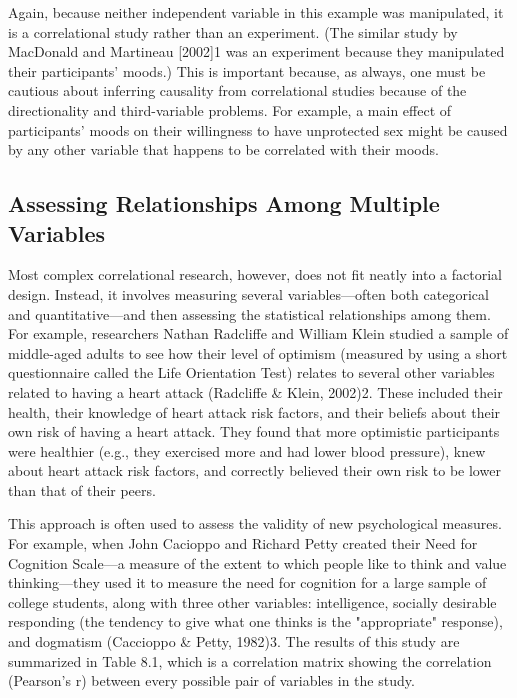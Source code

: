 Again, because neither independent variable in this example was manipulated, it is a correlational study rather than an experiment. (The similar study by MacDonald and Martineau [2002]1 was an experiment because they manipulated their participants' moods.) This is important because, as always, one must be cautious about inferring causality from correlational studies because of the directionality and third-variable problems. For example, a main effect of participants' moods on their willingness to have unprotected sex might be caused by any other variable that happens to be correlated with their moods.

\subsection{Assessing Relationships Among Multiple Variables}

Most complex correlational research, however, does not fit neatly into a factorial design. Instead, it involves measuring several variables---often both categorical and quantitative---and then assessing the statistical
relationships among them. For example, researchers Nathan Radcliffe and William Klein studied a sample of middle-aged adults to see how their level of optimism (measured by using a short questionnaire called the Life Orientation Test) relates to several other variables related to having a heart attack (Radcliffe \& Klein, 2002)2. These included their health, their knowledge of heart attack risk factors, and their beliefs about their own risk of having a heart attack. They found that more optimistic participants were healthier (e.g., they exercised more and had lower blood pressure), knew about heart attack risk factors, and correctly believed their own risk to be lower than that of their peers.

This approach is often used to assess the validity of new psychological measures. For example, when John Cacioppo and Richard Petty created their Need for Cognition Scale---a measure of the extent to which people like to think and value thinking---they used it to measure the need for cognition for a large sample of college students, along with three other variables: intelligence, socially desirable responding (the tendency to give what one thinks is the "appropriate" response), and dogmatism (Caccioppo \& Petty, 1982)3. The results of this study are summarized in Table 8.1, which is a correlation matrix showing the correlation (Pearson's r) between every possible pair of variables in the study. 

